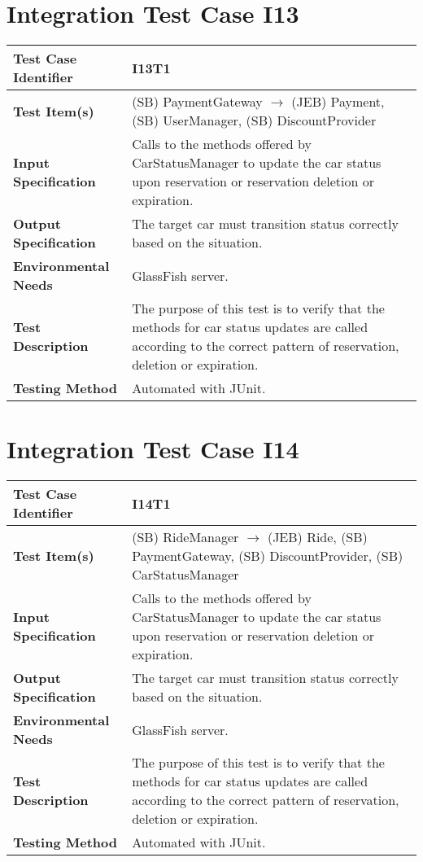 \section{Integration Test Case I13}

\begin{longtable}{p{} | p{}}
\textbf{Test Case Identifier} & I13T1\\
\hline
\textbf{Test Item(s)} & (SB) PaymentGateway $\rightarrow$ (JEB) Payment, (SB) UserManager, (SB) DiscountProvider \\
\hline
\textbf{Input Specification} & Calls to the methods offered by CarStatusManager to update the car status upon reservation or reservation deletion or expiration. \\
\hline
\textbf{Output Specification} & The target car must transition status correctly based on the situation. \\
\hline
\textbf{Environmental Needs} & GlassFish server. \\
\hline
\textbf{Test Description} & The purpose of this test is to verify that the methods for car status updates are called according to the correct pattern of reservation, deletion or expiration. \\
\hline
\textbf{Testing Method} & Automated with JUnit. \\
\hline
\end{longtable}

\section{Integration Test Case I14}

\begin{longtable}{p{} | p{}}
\textbf{Test Case Identifier} & I14T1\\
\hline
\textbf{Test Item(s)} & (SB) RideManager $\rightarrow$ (JEB) Ride, (SB) PaymentGateway, (SB) DiscountProvider, (SB) CarStatusManager \\
\hline
\textbf{Input Specification} & Calls to the methods offered by CarStatusManager to update the car status upon reservation or reservation deletion or expiration. \\
\hline
\textbf{Output Specification} & The target car must transition status correctly based on the situation. \\
\hline
\textbf{Environmental Needs} & GlassFish server. \\
\hline
\textbf{Test Description} & The purpose of this test is to verify that the methods for car status updates are called according to the correct pattern of reservation, deletion or expiration. \\
\hline
\textbf{Testing Method} & Automated with JUnit. \\
\hline
\end{longtable}


